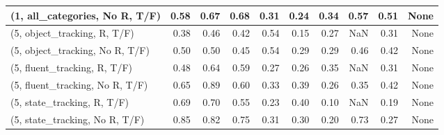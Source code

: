 \begin{table*}[h!]
\begin{adjustbox}{width=2\columnwidth,center}
\begin{tabular}{lrrr|rrr|rrr}
(1, all\_categories, No R, T/F)       &                      0.58 &                  0.67 &                      0.68 &                          0.31 &                      0.24 &                          0.34 &                                   0.57 &                               0.51 &                                  None \\



\midrule
(5, object\_tracking, R, T/F)         &                      0.38 &                  0.46 &                      0.42 &                          0.54 &                      0.15 &                          0.27 &                                    NaN &                               0.31 &                                  None \\
(5, object\_tracking, No R, T/F)      &                      0.50 &                  0.50 &                      0.45 &                          0.54 &                      0.29 &                          0.29 &                                   0.46 &                               0.42 &                                  None \\
(5, fluent\_tracking, R, T/F)         &                      0.48 &                  0.64 &                      0.59 &                          0.27 &                      0.26 &                          0.35 &                                    NaN &                               0.31 &                                  None \\
(5, fluent\_tracking, No R, T/F)      &                      0.65 &                  0.89 &                      0.60 &                          0.33 &                      0.39 &                          0.26 &                                   0.35 &                               0.42 &                                  None \\
(5, state\_tracking, R, T/F)          &                      0.69 &                  0.70 &                      0.55 &                          0.23 &                      0.40 &                          0.10 &                                    NaN &                               0.19 &                                  None \\
(5, state\_tracking, No R, T/F)       &                      0.85 &                  0.82 &                      0.75 &                          0.31 &                      0.30 &                          0.20 &                                   0.73 &                               0.27 &                                  None \\

\end{tabular}
\end{adjustbox}
\end{table*}
